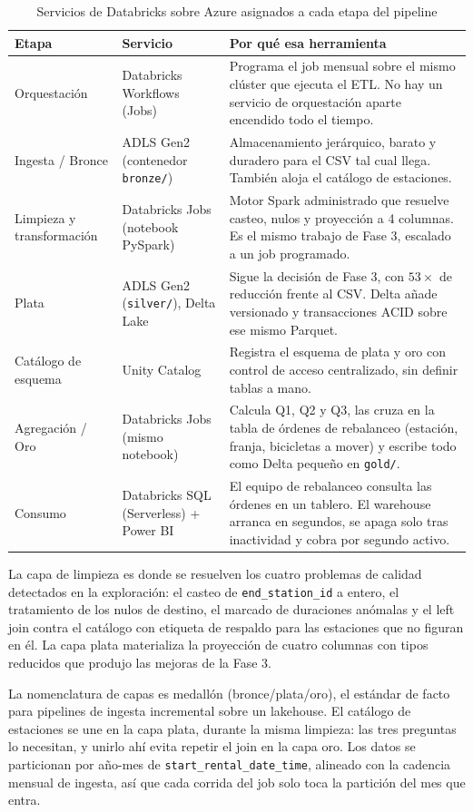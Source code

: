 \begin{table}[htbp]
\centering
\footnotesize
\caption{Servicios de Databricks sobre Azure asignados a cada etapa del pipeline}
\label{tab:pipeline-herramientas}
\begin{tabularx}{\textwidth}{>{\raggedright\arraybackslash}p{2.1cm}>{\raggedright\arraybackslash}p{3.4cm}X}
\toprule
Etapa & Servicio & Por qué esa herramienta \\
\midrule
Orquestación & Databricks Workflows (Jobs) & Programa el job mensual sobre el mismo clúster que ejecuta el ETL. No hay un servicio de orquestación aparte encendido todo el tiempo. \\
Ingesta / Bronce & ADLS Gen2 (contenedor \texttt{bronze/}) & Almacenamiento jerárquico, barato y duradero para el CSV tal cual llega. También aloja el catálogo de estaciones. \\
Limpieza y transformación & Databricks Jobs (notebook PySpark) & Motor Spark administrado que resuelve casteo, nulos y proyección a 4 columnas. Es el mismo trabajo de Fase 3, escalado a un job programado. \\
Plata & ADLS Gen2 (\texttt{silver/}), Delta Lake & Sigue la decisión de Fase 3, con $53\times$ de reducción frente al CSV. Delta añade versionado y transacciones ACID sobre ese mismo Parquet. \\
Catálogo de esquema & Unity Catalog & Registra el esquema de plata y oro con control de acceso centralizado, sin definir tablas a mano. \\
Agregación / Oro & Databricks Jobs (mismo notebook) & Calcula Q1, Q2 y Q3, las cruza en la tabla de órdenes de rebalanceo (estación, franja, bicicletas a mover) y escribe todo como Delta pequeño en \texttt{gold/}. \\
Consumo & Databricks SQL (Serverless) + Power BI & El equipo de rebalanceo consulta las órdenes en un tablero. El warehouse arranca en segundos, se apaga solo tras inactividad y cobra por segundo activo. \\
\bottomrule
\end{tabularx}
\end{table}

La capa de limpieza es donde se resuelven los cuatro problemas de calidad detectados en la exploración: el casteo de \texttt{end\_station\_id} a entero, el tratamiento de los nulos de destino, el marcado de duraciones anómalas y el left join contra el catálogo con etiqueta de respaldo para las estaciones que no figuran en él. La capa plata materializa la proyección de cuatro columnas con tipos reducidos que produjo las mejoras de la Fase 3.

La nomenclatura de capas es medallón (bronce/plata/oro), el estándar de facto para pipelines de ingesta incremental sobre un lakehouse. El catálogo de estaciones se une en la capa plata, durante la misma limpieza: las tres preguntas lo necesitan, y unirlo ahí evita repetir el join en la capa oro. Los datos se particionan por año-mes de \texttt{start\_rental\_date\_time}, alineado con la cadencia mensual de ingesta, así que cada corrida del job solo toca la partición del mes que entra.
